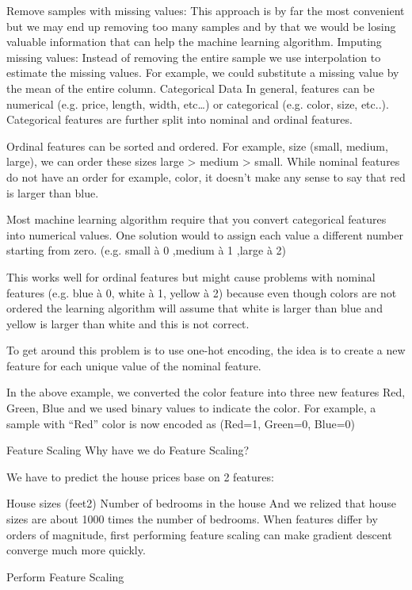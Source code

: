 Remove samples with missing values: This approach is by far the most convenient but we may end up removing too many samples and by that we would be losing valuable information that can help the machine learning algorithm.
Imputing missing values: Instead of removing the entire sample we use interpolation to estimate the missing values. For example, we could substitute a missing value by the mean of the entire column.
Categorical Data
In general, features can be numerical (e.g. price, length, width, etc…) or categorical (e.g. color, size, etc..). Categorical features are further split into nominal and ordinal features.

Ordinal features can be sorted and ordered. For example, size (small, medium, large), we can order these sizes large > medium > small. While nominal features do not have an order for example, color, it doesn’t make any sense to say that red is larger than blue.

Most machine learning algorithm require that you convert categorical features into numerical values. One solution would to assign each value a different number starting from zero. (e.g. small à 0 ,medium à 1 ,large à 2)

This works well for ordinal features but might cause problems with nominal features (e.g. blue à 0, white à 1, yellow à 2) because even though colors are not ordered the learning algorithm will assume that white is larger than blue and yellow is larger than white and this is not correct.

To get around this problem is to use one-hot encoding, the idea is to create a new feature for each unique value of the nominal feature.



In the above example, we converted the color feature into three new features Red, Green, Blue and we used binary values to indicate the color. For example, a sample with “Red” color is now encoded as (Red=1, Green=0, Blue=0)

Feature Scaling
Why have we do Feature Scaling?

We have to predict the house prices base on 2 features:

House sizes (feet2)
Number of bedrooms in the house
And we relized that house sizes are about 1000 times  the number of bedrooms. When features differ by orders of magnitude, first performing feature scaling can make gradient descent converge much more quickly.

Perform Feature Scaling

